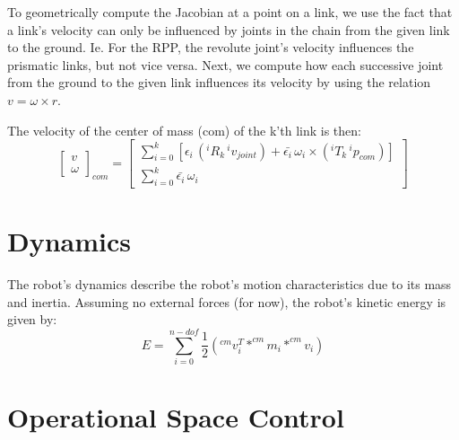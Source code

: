 \documentclass[12pt]{article}
\begin{document}
To geometrically compute the Jacobian at a point on a link, we use the fact that a link's 
velocity can only be influenced by joints in the chain from the given link to the ground. Ie.
For the RPP, the revolute joint's velocity influences the prismatic links, but not vice versa.
Next, we compute how each successive joint from the ground to the given link influences its
velocity by using the relation $v = \omega \times r$.

The velocity of the center of mass (com) of the k'th link is then:
\begin{equation}
  \begin{bmatrix}
    v \\
    \omega
  \end{bmatrix}_{com}
  = 
  \begin{bmatrix}
    \sum_{i=0}^{k}
    [ \epsilon_i\, (^{i}R_k\, ^{i}v_{joint}) + 
        \bar{\epsilon_i}\, \omega_{i} \times (^{i}T_k\, ^{i}p_{com})] \\
    \sum_{i=0}^{k}
        \bar{\epsilon_i}\, \omega_{i}
  \end{bmatrix}
\end{equation}

\section{Dynamics}
The robot's dynamics describe the robot's motion characteristics due to its mass and inertia. 
Assuming no external forces (for now), the robot's kinetic energy is given by:
\begin{equation}
  E = \sum_{i=0}^{n-dof} \frac{1}{2} (^{cm}v_i^T * ^{cm} m_i * ^{cm} v_i)
\end{equation}


\section{Operational Space Control}
\end{document}
